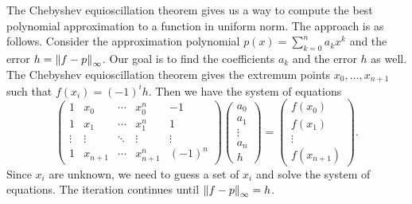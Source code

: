 \begin{remark}
    The Chebyshev equioscillation theorem gives us a way to compute the best 
    polynomial approximation to a function in uniform norm. The approach is 
    as follows. Consider the approximation polynomial $p(x) = \sum_{k=0}^{n}a_kx^k$ 
    and the error $h = \left\lVert {f-p} \right\rVert_\infty$. Our goal is to find the coefficients 
    $a_k$ and the error $h$ as well. The Chebyshev equioscillation theorem 
    gives the extremum points $x_0,\ldots,x_{n+1}$ such that $f(x_i) = (-1)^ih$. 
    Then we have the system of equations 
    \begin{equation*}
        \begin{pmatrix}
            1 & x_0 & \cdots & x_0^n & -1\\
            1 & x_1 & \cdots & x_1^n & 1 \\
            \vdots & \vdots & \ddots & \vdots &\vdots \\
            1 & x_{n+1} & \cdots & x_{n+1}^n & (-1)^n
        \end{pmatrix}
        \begin{pmatrix}
            a_0 \\ a_1 \\ \vdots \\ a_n \\ h
        \end{pmatrix}
        =
        \begin{pmatrix}
            f(x_0) \\ f(x_1) \\ \vdots \\ f(x_{n+1})
        \end{pmatrix}.
    \end{equation*}
    Since $x_i$ are unknown, we need to guess a set of $x_i$ and 
    solve the system of equations. The iteration continues until 
    $\left\lVert {f-p} \right\rVert_\infty = h$.
\end{remark}